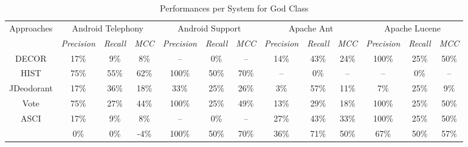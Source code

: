 \begin{table}
\caption{Performances per System for God Class}
\label{Table: performances god class}
\begin{adjustbox}{width=\textwidth}
\begin{tabular}{|c|c|c|c|c|c|c|c|c|c|c|c|c|}
\hline
\multirow{2}{*}{Approaches}& 
\multicolumn{3}{c|}{
	Android Telephony
} 
&\multicolumn{3}{c|}{
	Android Support
}
&\multicolumn{3}{c|}{
	Apache Ant
}
&\multicolumn{3}{c|}{
	Apache Lucene 
}\bigstrut [t] \\ 
\cline{2-13}
&\textit{Precision}&\textit{Recall}&\textit{  MCC  }
&\textit{Precision}&\textit{Recall}&\textit{  MCC  }
&\textit{Precision}&\textit{Recall}&\textit{  MCC  }
&\textit{Precision}&\textit{Recall}&\textit{  MCC  } \bigstrut [t]\\
\hline
DECOR &17\%&9\%&8\%&--&0\%&--&14\%&43\%&24\%&100\%&25\%&50\% \bigstrut \\ \hline
HIST &75\%&55\%&62\%&100\%&50\%&70\%&--&0\%&--&--&0\%&-- \bigstrut \\ \hline
JDeodorant &17\%&36\%&18\%&33\%&25\%&26\%&3\%&57\%&11\%&7\%&25\%&9\% \bigstrut \\ \hline
Vote &75\%&27\%&44\%&100\%&25\%&49\%&13\%&29\%&18\%&100\%&25\%&50\% \bigstrut \\ \hline
ASCI &17\%&9\%&8\%&--&0\%&--&27\%&43\%&33\%&100\%&25\%&50\% \bigstrut \\ \hline
\textbf{\NAME{}} &0\%&0\%&-4\%&100\%&50\%&70\%&36\%&71\%&50\%&67\%&50\%&57\% \bigstrut \\ \hline
\end{tabular}
\end{adjustbox}

\bigskip


\end{table}
